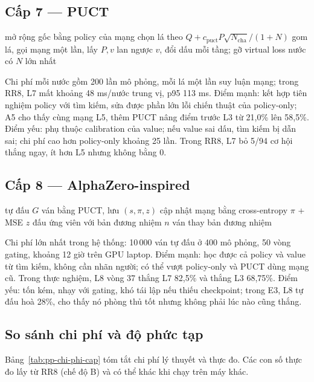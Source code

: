 \subsection{Cấp 7 --- PUCT}
\begin{algorithm}[H]
  \caption{PUCTAgent}
  \begin{algorithmic}[1]
    \STATE mở rộng gốc bằng policy của mạng
      \STATE chọn lá theo $Q + c_{\text{puct}}P\sqrt{N_{\text{cha}}}/(1+N)$
      \STATE gom lá, gọi mạng một lần, lấy $P, v$
      \STATE lan ngược $v$, đổi dấu mỗi tầng; gỡ virtual loss
    \ENDFOR
    \RETURN nước có $N$ lớn nhất
  \end{algorithmic}
\end{algorithm}
Chi phí mỗi nước gồm 200 lần mô phỏng, mỗi lá một lần suy luận mạng; trong RR8, L7 mất khoảng
48 ms/nước trung vị, p95 113 ms. Điểm mạnh: kết hợp tiên nghiệm policy với tìm kiếm, sửa được
phần lớn lỗi chiến thuật của policy-only; A5 cho thấy cùng mạng L5, thêm PUCT nâng điểm trước
L3 từ 21,0\% lên 58,5\%. Điểm yếu: phụ thuộc calibration của value; nếu value sai dấu, tìm kiếm
bị dẫn sai; chi phí cao hơn policy-only khoảng 25 lần. Trong RR8, L7 bỏ 5/94 cơ hội thắng ngay,
ít hơn L5 nhưng không bằng 0.

\subsection{Cấp 8 --- AlphaZero-inspired}
\begin{algorithm}[H]
  \caption{Vòng lặp L8}
  \begin{algorithmic}[1]
      \STATE tự đấu $G$ ván bằng PUCT, lưu $(s, \pi, z)$
      \STATE cập nhật mạng bằng cross-entropy $\pi$ + MSE $z$
      \STATE đấu ứng viên với bản đương nhiệm $n$ ván
       \STATE thay bản đương nhiệm \ENDIF
    \ENDFOR
  \end{algorithmic}
\end{algorithm}
Chi phí lớn nhất trong hệ thống: 10\,000 ván tự đấu ở 400 mô phỏng, 50 vòng gating, khoảng 12
giờ trên GPU laptop. Điểm mạnh: học được cả policy và value từ tìm kiếm, không cần nhãn người;
có thể vượt policy-only và PUCT dùng mạng cũ. Trong thực nghiệm, L8 vòng 37 thắng L7 82,5\% và
thắng L3 68,75\%. Điểm yếu: tốn kém, nhạy với gating, khó tái lập nếu thiếu checkpoint; trong
E3, L8 tự đấu hoà 28\%, cho thấy nó phòng thủ tốt nhưng không phải lúc nào cũng thắng.

\subsection{So sánh chi phí và độ phức tạp}
Bảng~\ref{tab:pp-chi-phi-cap} tóm tắt chi phí lý thuyết và thực đo. Các con số thực đo lấy từ
RR8 (chế độ B) và có thể khác khi chạy trên máy khác.


